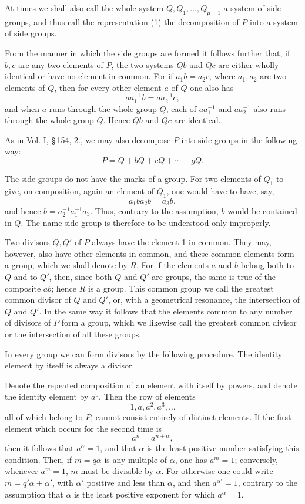 \documentclass[11pt]{article}
\begin{document}
At times we shall also call the whole system $Q,Q_1,\ldots,Q_{\mu-1}$ a system of side groups, and thus call the representation (1) the decomposition of $P$ into a system of side groups.

From the manner in which the side groups are formed it follows further that, if $b,c$ are any two elements of $P$, the two systems $Qb$ and $Qc$ are either wholly identical or have no element in common. For if $a_1b=a_2c$, where $a_1,a_2$ are two elements of $Q$, then for every other element $a$ of $Q$ one also has
\[
aa_1^{-1}b=aa_2^{-1}c,
\]
and when $a$ runs through the whole group $Q$, each of $aa_1^{-1}$ and $aa_2^{-1}$ also runs through the whole group $Q$. Hence $Qb$ and $Qc$ are identical.

As in Vol. I, \S\,154, 2., we may also decompose $P$ into side groups in the following way:
\[
P=Q+bQ+cQ+\cdots+gQ.
\]

The side groups do not have the marks of a group. For two elements of $Q_1$ to give, on composition, again an element of $Q_1$, one would have to have, say,
\[
a_1ba_2b=a_3b,
\]
and hence $b=a_2^{-1}a_1^{-1}a_3$. Thus, contrary to the assumption, $b$ would be contained in $Q$. The name side group is therefore to be understood only improperly.

Two divisors $Q,Q'$ of $P$ always have the element 1 in common. They may, however, also have other elements in common, and these common elements form a group, which we shall denote by $R$. For if the elements $a$ and $b$ belong both to $Q$ and to $Q'$, then, since both $Q$ and $Q'$ are groups, the same is true of the composite $ab$; hence $R$ is a group. This common group we call the greatest common divisor of $Q$ and $Q'$, or, with a geometrical resonance, the intersection of $Q$ and $Q'$. In the same way it follows that the elements common to any number of divisors of $P$ form a group, which we likewise call the greatest common divisor or the intersection of all these groups.

In every group we can form divisors by the following procedure. The identity element by itself is always a divisor.

Denote the repeated composition of an element with itself by powers, and denote the identity element by $a^0$. Then the row of elements
\[
1,a,a^2,a^3,\ldots
\]
all of which belong to $P$, cannot consist entirely of distinct elements. If the first element which occurs for the second time is
\[
a^n=a^{n+\alpha},
\]
then it follows that $a^\alpha=1$, and that $\alpha$ is the least positive number satisfying this condition. Then, if $m=q\alpha$ is any multiple of $\alpha$, one has $a^m=1$; conversely, whenever $a^m=1$, $m$ must be divisible by $\alpha$. For otherwise one could write $m=q'\alpha+\alpha'$, with $\alpha'$ positive and less than $\alpha$, and then $a^{\alpha'}=1$, contrary to the assumption that $\alpha$ is the least positive exponent for which $a^\alpha=1$.
\end{document}
